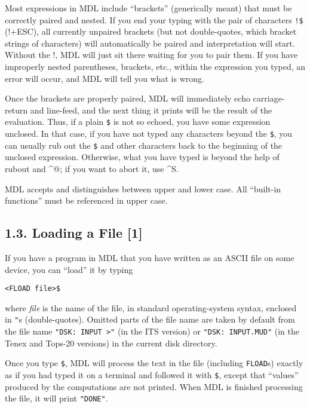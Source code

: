 \documentclass[a4paper,]{article}
\begin{document}
Most expressions in MDL include ``brackets'' (generically meant) that must be correctly paired and nested. If you end your
typing with the pair of characters \texttt{!\$}  (!+ESC), all currently unpaired brackets (but
not double-quotes, which bracket strings of characters) will automatically be paired and interpretation will start. Without
the !, MDL will just sit there waiting for you to pair them. If you have improperly nested parentheses, brackets, etc.,
within the expression you typed, an error will occur, and MDL will tell you what is wrong.

Once the brackets are properly paired, MDL will immediately echo carriage-return and line-feed, and the next thing it
prints will be the result of the evaluation. Thus, if a plain \texttt{\$} is not so echoed, you have some expression
unclosed. In that case, if you have not typed any characters beyond the \texttt{\$}, you can usually rub out the
\texttt{\$} and other characters back to the beginning of the unclosed expression. Otherwise, what you have typed is beyond
the help of rubout and \^{}@; if you want to abort it, use \^{}S.

MDL accepts and distinguishes between upper and lower case. All ``built-in functions'' must be referenced in upper case.

\subsection{1.3. Loading a File {[}1{]}}\label{loading-a-file-1}

If you have a program in MDL that you have written as an ASCII file on some device, you can ``load'' it by typing

\begin{verbatim}
<FLOAD file>$
\end{verbatim}

where \emph{file} is the name of the file, in standard operating-system syntax, enclosed in \texttt{"}s (double-quotes).
Omitted parts of the file name are taken by default from the file name \texttt{"DSK:\ INPUT\ \textgreater{}"} (in the ITS
version) or \texttt{"DSK:\ INPUT.MUD"} (in the Tenex and Tops-20 versions) in the current disk directory.

Once you type \texttt{\$}, MDL will process the text in the file (including \texttt{FLOAD}s) exactly as if you had typed it
on a terminal and followed it with \texttt{\$}, except that ``values'' produced by the computations are not printed. When
MDL is finished processing the file, it will print \texttt{"DONE"}.
\end{document}
